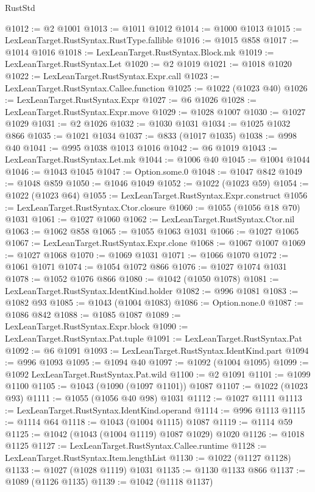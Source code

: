 \begin{lexlean}{RustStd}
\begin{coremodule}
@1012 := @2 @1001
@1013 := @1011 @1012
@1014 := @1000 @1013
@1015 := LexLeanTarget.RustSyntax.RustType.fallible
@1016 := @1015 @858
@1017 := @1014 @1016
@1018 := LexLeanTarget.RustSyntax.Block.mk
@1019 := LexLeanTarget.RustSyntax.Let
@1020 := @2 @1019
@1021 := @1018 @1020
@1022 := LexLeanTarget.RustSyntax.Expr.call
@1023 := LexLeanTarget.RustSyntax.Callee.function
@1025 := @1022 (@1023 @40)
@1026 := LexLeanTarget.RustSyntax.Expr
@1027 := @6 @1026
@1028 := LexLeanTarget.RustSyntax.Expr.move
@1029 := @1028 @1007
@1030 := @1027 @1029
@1031 := @2 @1026
@1032 := @1030 @1031
@1034 := @1025 @1032 @866
@1035 := @1021 @1034
@1037 := @833 (@1017 @1035)
@1038 := @998 @40
@1041 := @995 @1038 @1013 @1016
@1042 := @6 @1019
@1043 := LexLeanTarget.RustSyntax.Let.mk
@1044 := @1006 @40
@1045 := @1004 @1044
@1046 := @1043 @1045
@1047 := Option.some.{0}
@1048 := @1047 @842
@1049 := @1048 @859
@1050 := @1046 @1049
@1052 := @1022 (@1023 @59)
@1054 := @1022 (@1023 @64)
@1055 := LexLeanTarget.RustSyntax.Expr.construct
@1056 := LexLeanTarget.RustSyntax.Ctor.closure
@1060 := @1055 (@1056 @18 @70) @1031
@1061 := @1027 @1060
@1062 := LexLeanTarget.RustSyntax.Ctor.nil
@1063 := @1062 @858
@1065 := @1055 @1063 @1031
@1066 := @1027 @1065
@1067 := LexLeanTarget.RustSyntax.Expr.clone
@1068 := @1067 @1007
@1069 := @1027 @1068
@1070 := @1069 @1031
@1071 := @1066 @1070
@1072 := @1061 @1071
@1074 := @1054 @1072 @866
@1076 := @1027 @1074 @1031
@1078 := @1052 @1076 @866
@1080 := @1042 (@1050 @1078)
@1081 := LexLeanTarget.RustSyntax.IdentKind.holder
@1082 := @996 @1081
@1083 := @1082 @93
@1085 := @1043 (@1004 @1083)
@1086 := Option.none.{0}
@1087 := @1086 @842
@1088 := @1085 @1087
@1089 := LexLeanTarget.RustSyntax.Expr.block
@1090 := LexLeanTarget.RustSyntax.Pat.tuple
@1091 := LexLeanTarget.RustSyntax.Pat
@1092 := @6 @1091
@1093 := LexLeanTarget.RustSyntax.IdentKind.part
@1094 := @996 @1093
@1095 := @1094 @40
@1097 := @1092 (@1004 @1095)
@1099 := @1092 LexLeanTarget.RustSyntax.Pat.wild
@1100 := @2 @1091
@1101 := @1099 @1100
@1105 := @1043 (@1090 (@1097 @1101)) @1087
@1107 := @1022 (@1023 @93)
@1111 := @1055 (@1056 @40 @98) @1031
@1112 := @1027 @1111
@1113 := LexLeanTarget.RustSyntax.IdentKind.operand
@1114 := @996 @1113
@1115 := @1114 @64
@1118 := @1043 (@1004 @1115) @1087
@1119 := @1114 @59
@1125 := @1042 (@1043 (@1004 @1119) @1087 @1029) @1020
@1126 := @1018 @1125
@1127 := LexLeanTarget.RustSyntax.Callee.runtime
@1128 := LexLeanTarget.RustSyntax.Item.lengthList
@1130 := @1022 (@1127 @1128)
@1133 := @1027 (@1028 @1119) @1031
@1135 := @1130 @1133 @866
@1137 := @1089 (@1126 @1135)
@1139 := @1042 (@1118 @1137)

\end{coremodule}
\end{lexlean}
